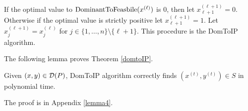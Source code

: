 \documentclass[runningheads]{llncs}
\begin{document}
If the optimal value to $\DOMtoS(x^{(\ell)})$ is 0, then let $x^{(\ell+1)}_{\ell+1} = 0$. Otherwise if the optimal value is strictly positive let $x^{(\ell+1)}_{\ell+1} = 1$. Let $x^{(\ell+1)}_j = x^{(\ell)}_j$ for $j\in \{1,\ldots,n\}\setminus \{\ell+1\}$. This procedure is the DomToIP algorithm.
\iffalse{
\begin{algorithm}[H]
	\KwIn{$(x,y)\in \dom(S)$}
	\KwOut{$(x^{(t)},y^{(t)}) \in S$, $x^{(t)}\leq x$}
	$x^{(0)}\leftarrow x$\\
	\For{$\ell = 0$ \textbf{to} $t-1$}{
		$x^{(\ell+1)} \leftarrow x^{(\ell)}$\\
		$\eta \leftarrow$ optimal value of $ \DOMtoS(x^{(\ell)})$\\
		$y^{(\ell+1)}\leftarrow$ optimal solution for $w$ variables in $ \DOMtoS(x^{(\ell)})$\\
		\eIf{$\eta = 0$}{
			$x^{(\ell+1)}_{\ell+1} \leftarrow 0$\
		}{
			$x^{(\ell+1)}_{\ell+1} \leftarrow 1$
		}
	}
	\label{domtoIPalg}
	\caption{The DomToIP algorithm}
\end{algorithm}
}\fi
The following lemma proves Theorem \ref{domtoIP}.
\begin{lemma}
	Given $(x,y)\in \operatorname{\mathcal{D}}(P)$, DomToIP algorithm correctly finds $(x^{(t)},y^{(t)})\in S$ in polynomial time.
\end{lemma}
The proof is in Appendix \ref{lemma4}.


\iffalse{
\begin{algorithm}[H]\label{FDTFull}
	\KwIn{$P= \{(x,y)\in \bbbr^{n\times p}: Ax+Gy\geq b\}$ and $S=\{(x,y)\in P: x\in \{0,1\}^n\}$ such that $g=\max_{c\in \bbbr^n_+ }\frac{\min_{(x,y)\in }cx}{\min_{(x,y)\in P}cx}$ is finite, $(x^*,y^*)\in P$}
	\KwOut{$(z^i,w^i)\in S$ and $\lambda_i\geq 0$ for $i=1,\ldots,k$ such that $\sum_{i=1}^{k}\lambda_i = 1$, and $\sum_{i=1}^{k}\lambda_iz^i\leq g^tx^*$ }
	$L^0\leftarrow [(x^*,y^*),1]$\\
	\For{$i=1$ \textbf{to} $t$}{
		$L'\leftarrow \emptyset$\\
		\For{$[(x,y),\lambda] \in L^i$}{
			Apply Lemma \ref{round-up} to obtain $[(\hat{x}^0,\hat{y}^0),\gamma_0]$ and $[(\hat{x}^1,\hat{y}^1),\gamma_1]$\\
			$L' \leftarrow L' \cup \{[(\hat{x}^0,\hat{y}^0),\gamma_0]\} \cup \{[(\hat{x}^1,\hat{y}^1),\gamma_1]\}$\\			
		}
		Apply Lemma \ref{prune} to $L'$ to obtain $L^{i+1}$. 
	}
	\For{$[(x,y),\lambda] \in L^t$}{
		Apply Algorithm \ref{domtoIP} to $(x,y)$ to obtain $(z,w)\in S$\\
		$F \leftarrow F \cup \{[(z,w),\lambda]\}$
	}
	\textbf{return} $F$
	\caption{Fractional Decomposition Tree Algorithm}
\end{algorithm}}\fi
\end{document}
